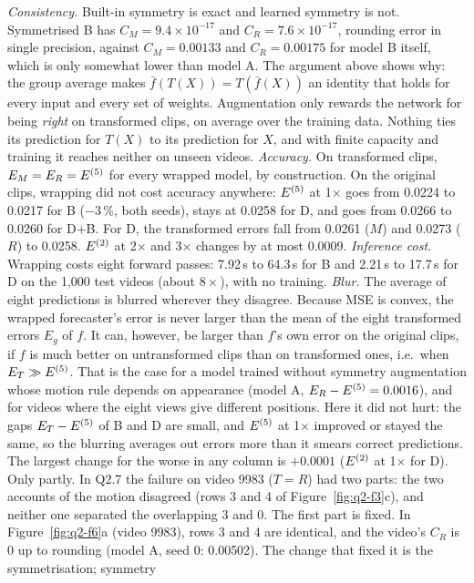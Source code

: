  \emph{Consistency.} Built-in symmetry is exact and learned symmetry is not. Symmetrised B has
$C_M=9.4\times10^{-17}$ and $C_R=7.6\times10^{-17}$, rounding error in single precision, against
$C_M=0.00133$ and $C_R=0.00175$ for model B itself, which is only somewhat lower than model A. The
argument above shows why: the group average makes $\bar f(T(X))=T(\bar f(X))$ an identity that holds for
every input and every set of weights. Augmentation only rewards the network for being \emph{right} on
transformed clips, on average over the training data. Nothing ties its prediction for $T(X)$ to its
prediction for $X$, and with finite capacity and training it reaches neither on unseen videos.
\emph{Accuracy.} On transformed clips, $E_M=E_R=E^{(5)}$ for every wrapped model, by construction. On the
original clips, wrapping did not cost accuracy anywhere: $E^{(5)}$ at 1$\times$ goes from 0.0224 to 0.0217
for B ($-3\,\%$, both seeds), stays at 0.0258 for D, and goes from 0.0266 to 0.0260 for D+B. For D, the
transformed errors fall from 0.0261 ($M$) and 0.0273 ($R$) to 0.0258. $E^{(2)}$ at 2$\times$ and 3$\times$
changes by at most 0.0009.
\emph{Inference cost.} Wrapping costs eight forward passes: 7.92\,s to 64.3\,s for B and 2.21\,s to 17.7\,s
for D on the 1,000 test videos (about $8\times$), with no training.
\emph{Blur.} The average of eight predictions is blurred wherever they disagree. Because MSE is convex,
the wrapped forecaster's error is never larger than the mean of the eight transformed errors $E_g$ of
$f$. It can, however, be larger than $f$'s own error on the original clips, if $f$ is much better on
untransformed clips than on transformed ones, i.e.\ when $E_T\gg E^{(5)}$. That is the case for a model trained without
symmetry augmentation whose motion rule depends on appearance (model A, $E_R-E^{(5)}=0.0016$), and for
videos where the eight views give different positions. Here it did not hurt: the gaps $E_T-E^{(5)}$ of B
and D are small, and $E^{(5)}$ at 1$\times$ improved or stayed the same, so the blurring averages out
errors more than it smears correct predictions. The largest change for the worse in any column is $+0.0001$ ($E^{(2)}$ at
1$\times$ for D).
 Only partly. In Q2.7 the failure on video 9983 ($T=R$) had two parts: the two accounts of
the motion disagreed (rows 3 and 4 of Figure~\ref{fig:q2-f3}c), and neither one separated the overlapping
3 and 0. The first part is fixed. In Figure~\ref{fig:q2-f6}a (video 9983), rows 3 and 4 are identical, and
the video's $C_R$ is 0 up to rounding (model A, seed 0: 0.00502). The change that fixed it is the symmetrisation; symmetry
